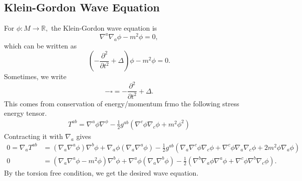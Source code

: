 \documentclass{article}
\numberwithin{equation}{section}
\begin{document}
\subsection{Klein-Gordon Wave Equation}
For $\phi: M\to \mathbb{R},$ the Klein-Gordon wave equation is 
\begin{equation*}
    \nabla^a\nabla_a \phi - m^2\phi = 0,
\end{equation*}
which can be written as 
\begin{equation*}
    \left(-\frac{\partial^2}{\partial t^2} + \Delta\right)\phi - m^2\phi = 0.
\end{equation*}
Sometimes, we write 
\begin{equation*}
    -\square = -\frac{\partial^2}{\partial t^2} + \Delta.
\end{equation*}
This comes from conservation of energy/momentum frmo the following stress energy tensor.
\begin{align*}
    T^{ab} = \nabla^a\phi \nabla^\phi - \frac{1}{2}g^{ab}\left(\nabla^c\phi \nabla_c\phi + m^2\phi^2\right)
\end{align*}
Contracting it with $\nabla_a$ gives 
\begin{align*}
    0 = \nabla_a T^{ab} &= (\nabla_a\nabla^a\phi)\nabla^b\phi + \nabla_a\phi(\nabla_a\nabla^a\phi) - \frac{1}{2}g^{ab}\left(\nabla_a\nabla^c \phi \nabla_c \phi + \nabla^c \phi \nabla_a\nabla_c \phi + 2m^2\phi \nabla_a\phi\right) \\ 
    0 &= (\nabla_a\nabla^a \phi - m^2\phi)\nabla^b\phi + \nabla^a\phi (\nabla_a\nabla^b\phi) - \frac{1}{2}\left(\nabla^b\nabla_a\phi\nabla^a\phi + \nabla^c\phi\nabla^b\nabla_c\phi\right).
\end{align*}
By the torsion free condition, we get the desired wave equation.
\end{document}
